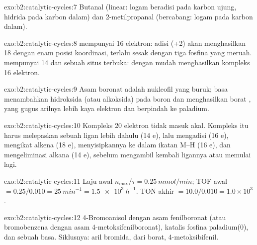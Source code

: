 \begin{solution}{exo:b2:catalytic-cycles:7}
Butanal  (linear: logam beradisi pada karbon ujung, hidrida
pada karbon dalam) dan 2-metilpropanal  (bercabang: logam
pada karbon dalam).
\end{solution}

\begin{solution}{exo:b2:catalytic-cycles:8}
 mempunyai 16 elektron: adisi  (+2) akan
menghasilkan 18 dengan enam posisi koordinasi, terlalu sesak dengan tiga
fosfina yang meruah.  mempunyai 14 dan sebuah situs
terbuka:  dengan mudah menghasilkan kompleks 16 elektron.
\end{solution}

\begin{solution}{exo:b2:catalytic-cycles:9}
Asam boronat adalah nukleofil yang buruk; basa menambahkan hidroksida (atau
alkoksida) pada boron dan menghasilkan borat , yang gugus
arilnya lebih kaya elektron dan berpindah ke paladium.
\end{solution}

\begin{solution}{exo:b2:catalytic-cycles:10}
Kompleks 20 elektron tidak masuk akal. Kompleks itu harus melepaskan sebuah
ligan lebih dahulu (14 e), lalu mengadisi  (16 e), mengikat alkena
(18 e), menyisipkannya ke dalam ikatan M--H (16 e), dan mengeliminasi alkana
(14 e), sebelum mengambil kembali ligannya atau memulai lagi.
\end{solution}

\begin{solution}{exo:b2:catalytic-cycles:11}
Laju awal $n_{\max}/\tau = \qty{0.25}{mmol/min}$; TOF awal $= 0.25/0.010 =
\qty{25}{min^{-1}} = \qty{1.5e3}{h^{-1}}$. TON akhir $= 10.0/0.010 = 1.0 \times 10^3$.
\end{solution}

\begin{solution}{exo:b2:catalytic-cycles:12}
4-Bromoanisol dengan asam fenilboronat (atau bromobenzena dengan asam
4-metoksifenilboronat), katalis fosfina paladium(0), dan sebuah basa.
Siklusnya:  aril bromida,  dari borat,
 4-metoksibifenil.
\end{solution}

